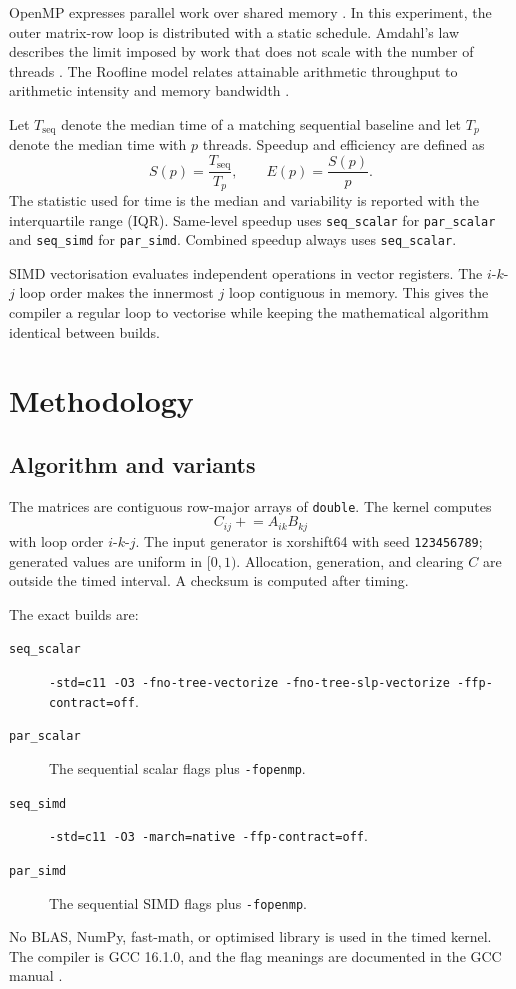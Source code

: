 \documentclass[a4paper,11pt]{article}
\begin{document}
OpenMP expresses parallel work over shared memory \cite{openmp}. In this experiment, the
outer matrix-row loop is distributed with a static schedule. Amdahl's law
describes the limit imposed by work that does not scale with the number of
threads \cite{amdahl}. The Roofline model relates attainable arithmetic
throughput to arithmetic intensity and memory bandwidth \cite{roofline}.

Let $T_{\mathrm{seq}}$ denote the median time of a matching sequential
baseline and let $T_p$ denote the median time with $p$ threads. Speedup and
efficiency are defined as
\[
 S(p)=\frac{T_{\mathrm{seq}}}{T_p},
 \qquad
 E(p)=\frac{S(p)}{p}.
\]
The statistic used for time is the median and variability is reported with
the interquartile range (IQR). Same-level speedup uses
\texttt{seq\_scalar} for \texttt{par\_scalar} and \texttt{seq\_simd} for
\texttt{par\_simd}. Combined speedup always uses \texttt{seq\_scalar}.

SIMD vectorisation evaluates independent operations in vector registers. The
$i$-$k$-$j$ loop order makes the innermost $j$ loop contiguous in memory.
This gives the compiler a regular loop to vectorise while keeping the
mathematical algorithm identical between builds.

\section{Methodology}

\subsection{Algorithm and variants}

The matrices are contiguous row-major arrays of \texttt{double}. The kernel
computes
\[
 C_{ij} \mathrel{+}= A_{ik}B_{kj}
\]
with loop order $i$-$k$-$j$. The input generator is xorshift64 with seed
\texttt{123456789}; generated values are uniform in $[0,1)$. Allocation,
generation, and clearing $C$ are outside the timed interval. A checksum is
computed after timing.

The exact builds are:
\begin{description}
\item[\texttt{seq\_scalar}] \texttt{-std=c11 -O3 -fno-tree-vectorize
-fno-tree-slp-vectorize -ffp-contract=off}.
\item[\texttt{par\_scalar}] The sequential scalar flags plus
\texttt{-fopenmp}.
\item[\texttt{seq\_simd}] \texttt{-std=c11 -O3 -march=native
-ffp-contract=off}.
\item[\texttt{par\_simd}] The sequential SIMD flags plus
\texttt{-fopenmp}.
\end{description}
No BLAS, NumPy, fast-math, or optimised library is used in the timed kernel.
The compiler is GCC 16.1.0, and the flag meanings are documented in the GCC
manual \cite{gcc}.
\end{document}
